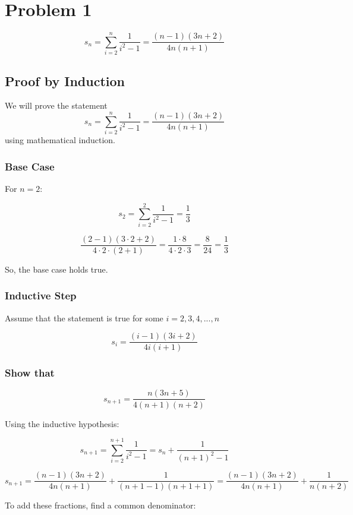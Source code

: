 \documentclass{article}
\begin{document}
\begin{flushleft}

\end{flushleft}

\section*{Problem 1}

\[
s_n = \sum_{i=2}^{n} \frac{1}{i^2 - 1} = \frac{(n-1)(3n+2)}{4n(n+1)}
\]

\subsection*{Proof by Induction}

We will prove the statement 
\[
s_n = \sum_{i=2}^{n} \frac{1}{i^2 - 1} = \frac{(n-1)(3n+2)}{4n(n+1)}
\]
using mathematical induction.

\subsubsection*{Base Case}
For \( n = 2 \):

\[
s_2 = \sum_{i=2}^{2} \frac{1}{i^2 - 1} = \frac{1}{3}
\]

\[
\frac{(2-1)(3 \cdot 2 + 2)}{4 \cdot 2 \cdot (2+1)} = \frac{1 \cdot 8}{4 \cdot 2 \cdot 3} = \frac{8}{24} = \frac{1}{3}
\]

So, the base case holds true.

\subsubsection*{Inductive Step}
Assume that the statement is true for some \( i = 2, 3, 4, ..., n \)

\[
s_i =  \frac{(i-1)(3i+2)}{4i(i+1)}
\]

\subsubsection*{Show that}

\[
s_{n+1} =  \frac{n(3n+5)}{4(n+1)(n+2)}
\]

Using the inductive hypothesis:

\[
s_{n+1} =  \sum_{i=2}^{n+1} \frac{1}{i^2 - 1} = s_n + \frac{1}{(n+1)^2 - 1}
\]

\[
s_{n+1} = \frac{(n-1)(3n+2)}{4n(n+1)} + \frac{1}{(n+1-1)(n+1+1)} = \frac{(n-1)(3n+2)}{4n(n+1)} + \frac{1}{n(n+2)}
\]

To add these fractions, find a common denominator:
\end{document}
